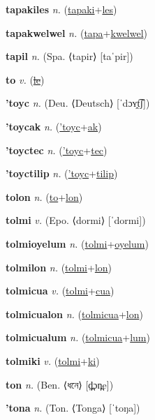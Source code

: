\textbf{\hypertarget{tapakiles}{tapakiles}} \textit{n.} (\hyperlink{tapaki}{tapaki}+\allowbreak \hyperlink{les}{les})


\textbf{\hypertarget{tapakwelwel}{tapakwelwel}} \textit{n.} (\hyperlink{tapa}{tapa}+\allowbreak \hyperlink{kwelwel}{kwelwel})


\textbf{\hypertarget{tapil}{tapil}} \textit{n.} (Spa. ⟨tapir⟩ [taˈpir])


\textbf{\hypertarget{to}{to}} \textit{v.} (\hyperlink{le}{\sout{le}})


\textbf{\hypertarget{'toyc}{'toyc}} \textit{n.} (Deu. ⟨Deutsch⟩ [ˈdɔʏ̯t͡ʃ])


\textbf{\hypertarget{'toycak}{'toycak}} \textit{n.} (\hyperlink{'toyc}{'toyc}+\allowbreak \hyperlink{ak}{ak})


\textbf{\hypertarget{'toyctec}{'toyctec}} \textit{n.} (\hyperlink{'toyc}{'toyc}+\allowbreak \hyperlink{tec}{tec})


\textbf{\hypertarget{'toyctilip}{'toyctilip}} \textit{n.} (\hyperlink{'toyc}{'toyc}+\allowbreak \hyperlink{tilip}{tilip})


\textbf{\hypertarget{tolon}{tolon}} \textit{n.} (\hyperlink{to}{to}+\allowbreak \hyperlink{lon}{lon})


\textbf{\hypertarget{tolmi}{tolmi}} \textit{v.} (Epo. ⟨dormi⟩ [ˈdormi])


\textbf{\hypertarget{tolmioyelum}{tolmioyelum}} \textit{n.} (\hyperlink{tolmi}{tolmi}+\allowbreak \hyperlink{oyelum}{oyelum})


\textbf{\hypertarget{tolmilon}{tolmilon}} \textit{n.} (\hyperlink{tolmi}{tolmi}+\allowbreak \hyperlink{lon}{lon})


\textbf{\hypertarget{tolmicua}{tolmicua}} \textit{v.} (\hyperlink{tolmi}{tolmi}+\allowbreak \hyperlink{cua}{cua})


\textbf{\hypertarget{tolmicualon}{tolmicualon}} \textit{n.} (\hyperlink{tolmicua}{tolmicua}+\allowbreak \hyperlink{lon}{lon})


\textbf{\hypertarget{tolmicualum}{tolmicualum}} \textit{n.} (\hyperlink{tolmicua}{tolmicua}+\allowbreak \hyperlink{lum}{lum})


\textbf{\hypertarget{tolmiki}{tolmiki}} \textit{v.} (\hyperlink{tolmi}{tolmi}+\allowbreak \hyperlink{ki}{ki})


\textbf{\hypertarget{ton}{ton}} \textit{n.} (Ben. ⟨{\bengali{}ধনে}⟩ [d̪̤ɔn̪e])


\textbf{\hypertarget{'tona}{'tona}} \textit{n.} (Ton. ⟨Tonga⟩ [ˈtoŋa])


